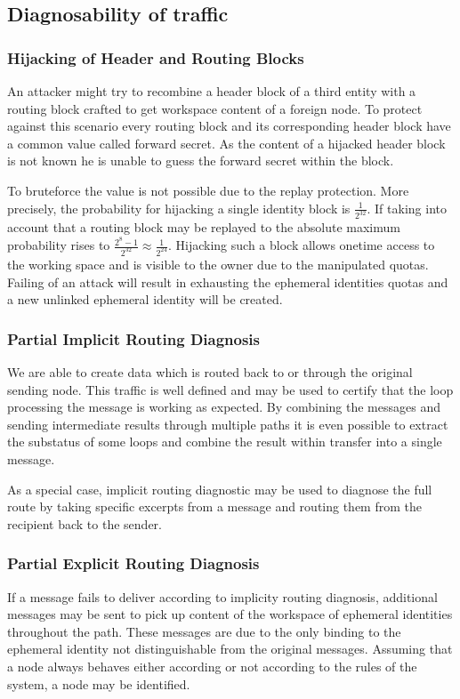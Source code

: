 \subsection{Diagnosability of traffic}

\subsubsection{Hijacking of Header and Routing Blocks}
An attacker might try to recombine a header block of a third entity with a routing block crafted to get workspace content of a foreign node. To protect against this scenario every routing block and its corresponding header block have a common value called forward secret. As the content of a hijacked header block is not known he is unable to guess the forward secret within the block.

To bruteforce the value is not possible due to the replay protection. More precisely, the probability for hijacking a single identity block is $\frac{1}{2^{32}}$. If taking into account that a routing block may be replayed to the absolute maximum probability rises to $\frac{2^8-1}{2^{32}}\approx\frac{1}{2^{24}}$. Hijacking such a block allows onetime access to the working space and is visible to the owner due to the manipulated quotas. Failing of an attack will result in exhausting the ephemeral identities quotas and a new unlinked ephemeral identity will be created. 
 

\subsubsection{Partial Implicit Routing Diagnosis}
We are able to create data which is routed back to or through the original sending node. This traffic is well defined and may be used to certify that the loop processing the message is working as expected. By combining the messages and sending intermediate results through multiple paths it is even possible to extract the substatus of some loops and combine the result within transfer into a single message.

As a special case, implicit routing diagnostic may be used to diagnose the full route by taking specific excerpts from a message and routing them from the recipient back to the sender. 

\subsubsection{Partial Explicit Routing Diagnosis}
If a message fails to deliver according to implicity routing diagnosis, additional messages may be sent to pick up content of the workspace of ephemeral identities throughout the path. These messages are due to the only binding to the ephemeral identity not distinguishable from the original messages. Assuming that a node always behaves either according or not according to the rules of the system, a node may be identified.

